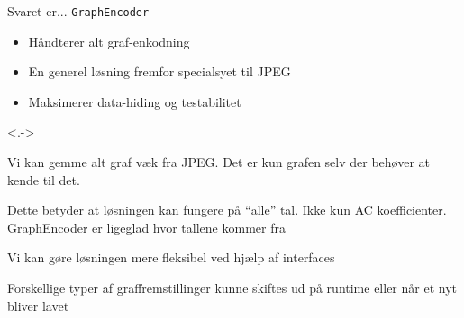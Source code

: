 \begin{frame}[fragile]{Svaret er...}{}
\lstinline|GraphEncoder|
\begin{itemize}
	\item Håndterer alt graf-enkodning
	\item En generel løsning fremfor specialsyet til JPEG
	\item Maksimerer data-hiding og testabilitet
\end{itemize}

 {
	
}
 {
	
}
\note<.->{
	Vi kan gemme alt graf væk fra JPEG. Det er kun grafen selv der behøver at kende til det.

	Dette betyder at løsningen kan fungere på ``alle'' tal. Ikke kun AC koefficienter. GraphEncoder er ligeglad hvor tallene kommer fra

	Vi kan gøre løsningen mere fleksibel ved hjælp af interfaces

	Forskellige typer af graffremstillinger kunne skiftes ud på runtime eller når et nyt bliver lavet
}
\end{frame}